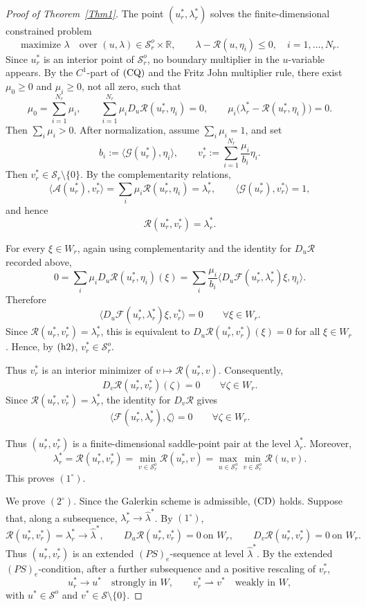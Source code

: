 \documentclass[preprint,10pt]{elsarticle}
\numberwithin{equation}{section}
\begin{document}
\begin{proof}[Proof of Theorem~\ref{Thm1}]
	The point \((u_r^*,\lambda_r^*)\) solves the finite-dimensional constrained
	problem
	\[
	\text{maximize }\lambda
	\quad\text{over }(u,\lambda)\in\mathcal S_r^o\times\mathbb R,
	\qquad
	\lambda-\mathcal R(u,\eta_i)\le0,\quad i=1,\ldots,N_r .
	\]
	Since \(u_r^*\) is an interior point of \(\mathcal S_r^o\), no boundary
	multiplier in the \(u\)-variable appears. By the \(C^1\)-part of
	\({\rm (CQ)}\) and the Fritz John multiplier rule, there exist
	\(\mu_0\ge0\) and \(\mu_i\ge0\), not all zero, such that
	\[
	\mu_0=\sum_{i=1}^{N_r}\mu_i,\qquad
	\sum_{i=1}^{N_r}\mu_iD_u\mathcal R(u_r^*,\eta_i)=0,
	\qquad
	\mu_i\bigl(\lambda_r^*-\mathcal R(u_r^*,\eta_i)\bigr)=0 .
	\]
	Then \(\sum_i\mu_i>0\). After normalization, assume
	\(\sum_i\mu_i=1\), and set
	\[
	b_i:=\langle\mathcal G(u_r^*),\eta_i\rangle,
	\qquad
	v_r^*:=
	\sum_{i=1}^{N_r}\frac{\mu_i}{b_i}\eta_i .
	\]
	Then \(v_r^*\in\mathcal S_r\setminus\{0\}\). By the complementarity
	relations,
	\[
	\langle\mathcal A(u_r^*),v_r^*\rangle
	=
	\sum_i\mu_i\mathcal R(u_r^*,\eta_i)
	=
	\lambda_r^*,
	\qquad
	\langle\mathcal G(u_r^*),v_r^*\rangle=1,
	\]
	and hence
	\[
	\mathcal R(u_r^*,v_r^*)=\lambda_r^*.
	\]
	
	For every \(\xi\in W_r\), again using complementarity and the identity for
	\(D_u\mathcal R\) recorded above,
	\[
	0
	=
	\sum_i\mu_iD_u\mathcal R(u_r^*,\eta_i)(\xi)
	=
	\sum_i
	\frac{\mu_i}{b_i}
	\bigl\langle
	D_u\mathcal F(u_r^*,\lambda_r^*)\xi,\eta_i
	\bigr\rangle .
	\]
	Therefore
	\[
	\bigl\langle
	D_u\mathcal F(u_r^*,\lambda_r^*)\xi,v_r^*
	\bigr\rangle=0
	\qquad \forall \xi\in W_r .
	\]
	Since \(\mathcal R(u_r^*,v_r^*)=\lambda_r^*\), this is equivalent to
	\(D_u\mathcal R(u_r^*,v_r^*)(\xi)=0\) for all \(\xi\in W_r\). Hence, by
	\({\rm (h2)}\), \(v_r^*\in\mathcal S_r^o\).
	
	Thus \(v_r^*\) is an interior minimizer of
	\(v\mapsto\mathcal R(u_r^*,v)\). Consequently,
	\[
	D_v\mathcal R(u_r^*,v_r^*)(\zeta)=0
	\qquad \forall \zeta\in W_r .
	\]
	Since \(\mathcal R(u_r^*,v_r^*)=\lambda_r^*\), the identity for
	\(D_v\mathcal R\) gives
	\[
	\langle\mathcal F(u_r^*,\lambda_r^*),\zeta\rangle=0
	\qquad \forall \zeta\in W_r .
	\]
	
	Thus \((u_r^*,v_r^*)\) is a finite-dimensional saddle-point pair at the
	level \(\lambda_r^*\). Moreover,
	\[
	\lambda_r^*
	=
	\mathcal R(u_r^*,v_r^*)
	=
	\min_{v\in\mathcal S_r^o}\mathcal R(u_r^*,v)
	=
	\max_{u\in\mathcal S_r^o}
	\min_{v\in\mathcal S_r^o}\mathcal R(u,v).
	\]
	This proves \((1^\circ)\).
	
	We prove \((2^\circ)\). Since the Galerkin scheme is admissible,
	\({\rm (CD)}\) holds. Suppose that, along a subsequence,
	\(\lambda_r^*\to\hat\lambda^*\). By \((1^\circ)\),
	\[
	\mathcal R(u_r^*,v_r^*)=\lambda_r^*\to\hat\lambda^*,
	\qquad
	D_u\mathcal R(u_r^*,v_r^*)=0\ \text{on }W_r,
	\qquad
	D_v\mathcal R(u_r^*,v_r^*)=0\ \text{on }W_r .
	\]
	Thus \((u_r^*,v_r^*)\) is an extended \((PS)_e\)-sequence at level
	\(\hat\lambda^*\). By the extended \((PS)_e\)-condition, after a further
	subsequence and a positive rescaling of \(v_r^*\),
	\[
	u_r^*\to u^* \quad\text{strongly in }W,
	\qquad
	v_r^*\rightharpoonup v^* \quad\text{weakly in }W,
	\]
	with \(u^*\in\mathcal S^o\) and \(v^*\in\mathcal S\setminus\{0\}\).
	

\end{proof}
\end{document}
